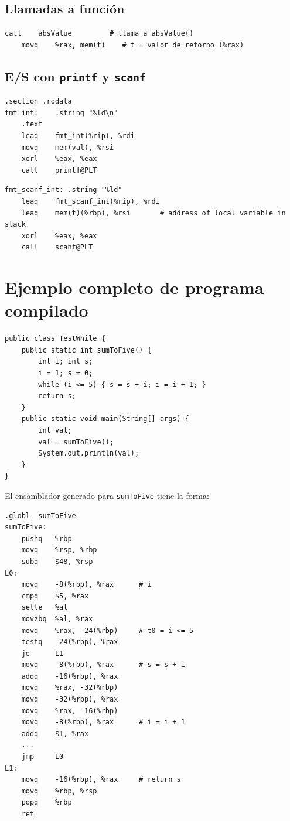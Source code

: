 \subsection{Llamadas a función}

\begin{lstlisting}[style=asm, caption={Llamada a función y recogida de valor de retorno}]
    call    absValue         # llama a absValue()
    movq    %rax, mem(t)    # t = valor de retorno (%rax)
\end{lstlisting}

\subsection{E/S con \texttt{printf} y \texttt{scanf}}

\begin{lstlisting}[style=asm, caption={Impresión de entero con printf}]
    .section .rodata
fmt_int:    .string "%ld\n"
    .text
    leaq    fmt_int(%rip), %rdi
    movq    mem(val), %rsi
    xorl    %eax, %eax
    call    printf@PLT
\end{lstlisting}

\begin{lstlisting}[style=asm, caption={Lectura de entero con scanf}]
fmt_scanf_int: .string "%ld"
    leaq    fmt_scanf_int(%rip), %rdi
    leaq    mem(t)(%rbp), %rsi       # address of local variable in stack
    xorl    %eax, %eax
    call    scanf@PLT
\end{lstlisting}

\section{Ejemplo completo de programa compilado}

\begin{lstlisting}[style=java, caption={Programa fuente: suma hasta 5}]
public class TestWhile {
    public static int sumToFive() {
        int i; int s;
        i = 1; s = 0;
        while (i <= 5) { s = s + i; i = i + 1; }
        return s;
    }
    public static void main(String[] args) {
        int val;
        val = sumToFive();
        System.out.println(val);
    }
}
\end{lstlisting}

El ensamblador generado para \texttt{sumToFive} tiene la forma:

\begin{lstlisting}[style=asm, caption={Ensamblador x86-64 generado para sumToFive}]
    .globl  sumToFive
sumToFive:
    pushq   %rbp
    movq    %rsp, %rbp
    subq    $48, %rsp
L0:
    movq    -8(%rbp), %rax      # i
    cmpq    $5, %rax
    setle   %al
    movzbq  %al, %rax
    movq    %rax, -24(%rbp)     # t0 = i <= 5
    testq   -24(%rbp), %rax
    je      L1
    movq    -8(%rbp), %rax      # s = s + i
    addq    -16(%rbp), %rax
    movq    %rax, -32(%rbp)
    movq    -32(%rbp), %rax
    movq    %rax, -16(%rbp)
    movq    -8(%rbp), %rax      # i = i + 1
    addq    $1, %rax
    ...
    jmp     L0
L1:
    movq    -16(%rbp), %rax     # return s
    movq    %rbp, %rsp
    popq    %rbp
    ret
\end{lstlisting}
